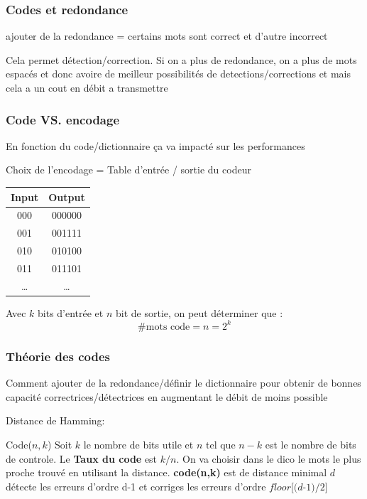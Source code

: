 \documentclass[12pt]{article}
\begin{document}
		\subsubsection{Codes et redondance}
			ajouter de la redondance = certains mots sont correct et d'autre incorrect
			
			Cela permet détection/correction. Si on a plus de redondance, on a plus de mots espacés et donc avoire de meilleur possibilités de detections/corrections et mais cela a un cout en débit a transmettre
			
		\subsubsection{Code VS. encodage}
			En fonction du code/dictionnaire ça va impacté sur les performances
			
			Choix de l'encodage  = Table d'entrée / sortie du codeur
			
			\begin{tabular}{|c|c|}
			\hline
			Input & Output\\ \hline
			000 & 000000 \\ \hline
			001 & 001111 \\ \hline
			010 & 010100 \\ \hline
			011 & 011101 \\ \hline
			\dots & \dots \\ \hline
			
			\end{tabular}
			
			Avec $k$ bits d'entrée et $n$ bit de sortie, on peut déterminer que :
			\begin{equation}
				\# \text{mots code} = n = 2^k
			\end{equation}
			
		\subsubsection{Théorie des codes}
		
			Comment ajouter de la redondance/définir le dictionnaire pour obtenir de bonnes capacité correctrices/détectrices en augmentant le débit de moins possible
			
			Distance de Hamming:
			
			Code($n,k$) Soit $k$ le nombre de bits utile et $n$ tel que $n-k$ est le nombre de bits de controle. Le \textbf{Taux du code} est $k/n$. On va choisir dans le dico le mots le plus proche trouvé en utilisant la distance. \textbf{code(n,k)} est de distance minimal $d$ détecte les erreurs d'ordre d-1 et corriges les erreurs d'ordre $\textit{floor[(d-1)/2]}$
			
\end{document}
